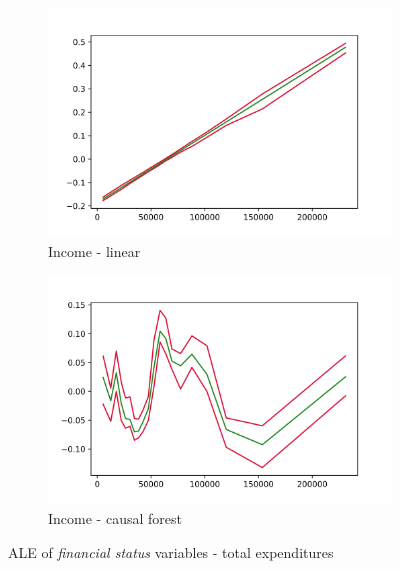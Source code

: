 \begin{figure}[h]
    \begin{subfigure}{0.5\linewidth}
        \includegraphics[width=\linewidth]{figures/ALE/chSNDexp/spec3_linear_FINCBTXM.png}
        \caption{Income - linear}
    \end{subfigure}%
    \begin{subfigure}{0.5\linewidth}
        \includegraphics[width=\linewidth]{figures/ALE/chSNDexp/spec3_cf_FINCBTXM.png}
        \caption{Income - causal forest}
    \end{subfigure}
    \caption{ALE of \textit{financial status} variables - total expenditures}
    \label{app:ale_finstat_snd}
\end{figure}

